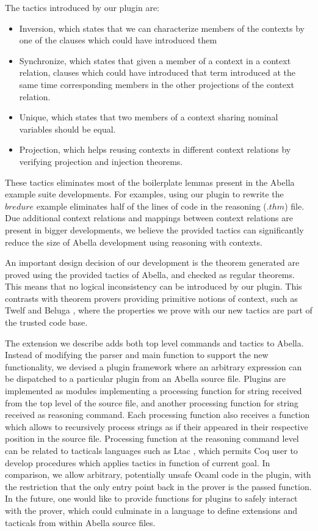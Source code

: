 \documentclass[nocopyrightspace,authoryear]{sigplanconf}
\begin{document}
The tactics introduced by our plugin are:
\begin{itemize}
\item Inversion, which states that we can characterize members of the contexts by one of the clauses which could have introduced them
\item Synchronize, which states that given a member of a context in a context relation, clauses which could have introduced that term introduced at the same time corresponding members in the other projections of the context relation.
\item Unique, which states that two members of a context sharing nominal variables should be equal.
\item Projection, which helps reusing contexts in different context relations by verifying projection and injection theorems.
\end{itemize}
These tactics eliminates most of the boilerplate lemmas present in the Abella example suite developments. For examples, using our plugin to rewrite the $bredure$ example eliminates half of the lines of code in the reasoning ($.thm$) file. Due additional context relations and mappings between context relations are present in bigger developments, we believe the provided tactics can significantly reduce the size of Abella development using reasoning with contexts.

An important design decision of our development is the theorem generated are proved using the provided tactics of Abella, and checked as regular theorems. This means that no logical inconsistency can be introduced by our plugin. This contrasts with theorem provers providing primitive notions of context, such as Twelf \cite{twelfsys} and Beluga \cite{belugasys}, where the properties we prove with our new tactics are part of the trusted code base.

The extension we describe adds both top level commands and tactics to Abella. Instead of modifying the parser and main function to support the new functionality, we devised a plugin framework where an arbitrary expression can be dispatched to a particular plugin from an Abella source file. Plugins are implemented as modules implementing a processing function for string received from the top level of the source file, and another processing function for string received as reasoning command. Each processing function also receives a function which allows to recursively process strings as if their appeared in their respective position in the source file. Processing function at the reasoning command level can be related to tacticals languages such as Ltac \cite{ltacpap}, which permits Coq user to develop procedures which applies tactics in function of current goal. In comparison, we allow arbitrary, potentially unsafe Ocaml code in the plugin, with the restriction that the only entry point back in the prover is the passed function. In the future, one would like to provide functions for plugins to safely interact with the prover, which could culminate in a language to define extensions and tacticals from within Abella source files.





\end{document}
